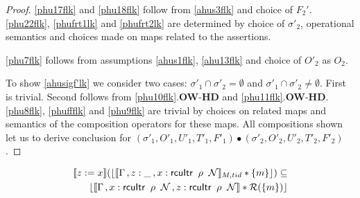 \begin{proof}
\ref{phu17flk} and \ref{phu18flk} follow from \ref{ahus3flk} and choice of $F_2'$. \ref{phu22flk}, \ref{phufrt1lk} and \ref{phufrt2lk} are determined by  choice of $\sigma'_2$, operational semantics and choices made on maps related to the assertions.

\ref{phu7flk} follows from assumptions \ref{ahus1flk}, \ref{ahu13flk} and choice of $O'_2$ as $O_2$.

To show \ref{ahusigf'lk} we consider two cases: $\sigma'_1 \cap \sigma'_2 = \emptyset$ and $\sigma'_1 \cap \sigma'_2 \neq \emptyset$. First is trivial. Second follows from \ref{phu10flk}.\textbf{OW}-\textbf{HD} and \ref{phu11flk}.\textbf{OW}-\textbf{HD}. \ref{phu8flk}, \ref{phuffflk} and \ref{phu9flk} are trivial by choices on related maps and semantics of the composition operators for these maps. All compositions shown  let us to derive conclusion for $(\sigma'_1, O'_1, U'_1, T'_1,F'_1) \bullet (\sigma'_2, O'_2, U'_2, T'_2,F'_2) $.
 \end{proof}
 \begin{lemma}
   \label{lemma:readstack}
\begin{align*}
  \llbracket z:=x \rrbracket (\lfloor \llbracket \Gamma\,, z:\_ \, ,\rcuitrT{x}{G}{k}{k+1}{\_} \rrbracket_{M,tid} * \{m\}\rfloor)  \subseteq \\
                                                              \lfloor \llbracket \Gamma\,, \rcuitrT{x}{G}{k}{k+1}{\_}\, , \rcuitrT{z}{G}{k}{k+1}{\_}  \rrbracket  * \mathcal{R}(\{m\})\rfloor
\end{align*}
 \end{lemma}
